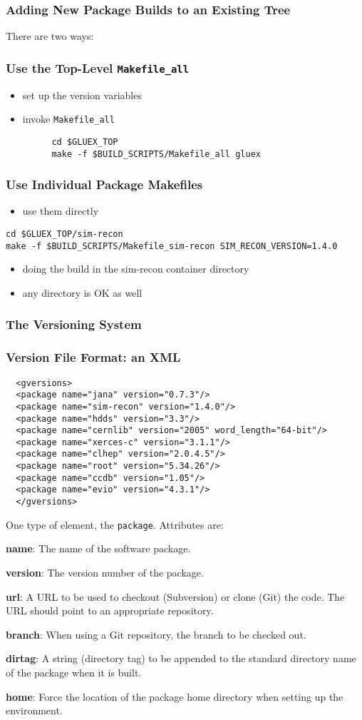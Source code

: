 \documentclass{beamer}
\newcommand{\bi}{\begin{itemize}}
\newcommand{\ei}{\end{itemize}}
\newcommand{\I}{\item}
\begin{document}
\begin{frame}\frametitle{Adding New Package Builds to an Existing Tree}\label{section:adding-packages}

There are two ways:

\end{frame}
\begin{frame}[fragile]\frametitle{Use the Top-Level {\tt Makefile\_all}}
\bi
\I set up the version variables
\I invoke {\tt Makefile\_all}
\ei
\begin{verbatim}
         cd $GLUEX_TOP
         make -f $BUILD_SCRIPTS/Makefile_all gluex
\end{verbatim}

\end{frame}
\begin{frame}[fragile]\frametitle{Use Individual Package Makefiles}
\bi
\I use them directly
\ei
\begin{verbatim}
cd $GLUEX_TOP/sim-recon
make -f $BUILD_SCRIPTS/Makefile_sim-recon SIM_RECON_VERSION=1.4.0
\end{verbatim}
\bi
\I doing the build in the sim-recon container directory
\I any directory is OK as well
\ei
\end{frame}
\begin{frame}\frametitle{The Versioning System}\label{section:versioning}

\end{frame}
\begin{frame}[fragile]
  \frametitle{Version File Format: an XML}

\begin{verbatim}
  <gversions>
  <package name="jana" version="0.7.3"/>
  <package name="sim-recon" version="1.4.0"/>
  <package name="hdds" version="3.3"/>
  <package name="cernlib" version="2005" word_length="64-bit"/>
  <package name="xerces-c" version="3.1.1"/>
  <package name="clhep" version="2.0.4.5"/>
  <package name="root" version="5.34.26"/>
  <package name="ccdb" version="1.05"/>
  <package name="evio" version="4.3.1"/>
  </gversions>
\end{verbatim}

One type of element, the {\tt package}. Attributes are:

\begin{description}
\item{\bf name}: The name of the software package.
\item{\bf version}: The version number of the package.
\item{\bf url}: A URL to be used to checkout (Subversion) or clone
  (Git) the code. The URL should point to an appropriate repository.
\item{\bf branch}: When using a Git repository, the branch to be
  checked out.
\item{\bf dirtag}: A string (directory tag) to be appended to the
  standard directory name of the package when it is built.
\item{\bf home}: Force the location of the package home directory when setting up the environment.
\end{description}

\end{frame}
\end{document}
